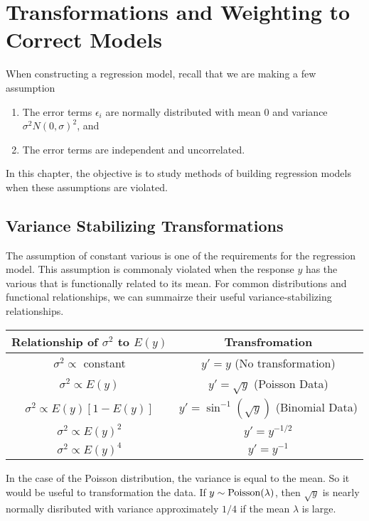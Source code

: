 
\chapter{Transformations and Weighting to Correct Models}

When constructing a regression model, recall that we are making a few assumption

\begin{enumerate}
    \item The error terms $\epsilon_i$ are normally distributed with mean 0 and variance $\sigma^2N(0,\sigma)^2$, and 
    \item The error terms are independent and uncorrelated.
\end{enumerate} 

In this chapter, the objective is to study methods of building regression models when these assumptions are violated.   

\section{Variance Stabilizing Transformations}

The assumption of constant various is one of the requirements for the regression model. This assumption is commonaly violated when the response $y$ has the various that is functionally related to its mean. For common distributions and functional relationships, we can summairze their useful variance-stabilizing relationships.

\renewcommand{\arraystretch}{1.5}
\begin{center}
    \begin{tabular}{|c|c|}
        \hline
        Relationship of $\sigma^2$ to $E(y)$ & Transfromation \\
        \hline
        $\sigma^2 \propto$ constant & $y' = y$ (No transformation)\\
        $\sigma^2 \propto E(y)$ & $y' = \sqrt{y}$ (Poisson Data)\\
        $\sigma^2 \propto E(y)[1-E(y)]$ & $y' = \sin^{-1}(\sqrt{y})$ (Binomial Data)\\
        $\sigma^2 \propto E(y)^2$ & $y' = y^{-1/2}$\\ 
        $\sigma^2 \propto E(y)^4$ & $y' = y^{-1}$ \\
        \hline
    \end{tabular}
\end{center}


In the case of the Poisson distribution, the variance is equal to the mean. So it would be useful to transformation the data. If $y \sim \operatorname{Poisson}(\lambda)$, then $\sqrt{y}$ is nearly normally disributed with variance approximately $1/4$ if the mean $\lambda$ is large.\\

